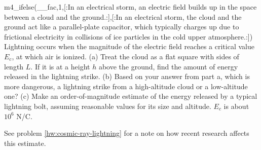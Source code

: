 m4_ifelse(__fac,1,[:In an electrical storm, an electric field builds up
in the space between a cloud and the ground.:],[:In an electrical storm, the cloud and the ground act like   
a parallel-plate capacitor, which typically charges up due
to frictional electricity in collisions of ice particles in   
the cold upper atmosphere.:])
Lightning occurs when the
magnitude of the electric field reaches a critical
value $E_c$, at which air is ionized.\hwendpart
(a) Treat the cloud as a flat square with sides of length
$L$. If it is at a height $h$ above the ground, find the
amount of energy released in the lightning strike.\answercheck\hwendpart
(b) Based on your answer from part a, which is more
dangerous, a lightning strike from a high-altitude cloud
or a low-altitude one?\hwendpart
(c) Make an order-of-magnitude estimate of the energy
released by a typical lightning bolt, assuming reasonable
values for its size and altitude.  $E_c$ is about $10^6$  N/C.

See problem \ref{hw:cosmic-ray-lightning} for a note on how recent research affects this estimate.
